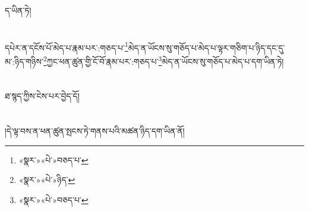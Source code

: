 ད་ཡིན་ཏེ།\chapter{ }དཔེར་ན་དངོས་པོ་མེད་པ་རྣམ་པར་:གཅད་པ་\footnote{«སྣར་»«པེ་»བཅད་པ་}མེད་ན་ཡོངས་སུ་གཅོད་པ་མེད་པ་ལྟར་གཅིག་པ་ཉིད་དང་དུ་མ་:ཉིད་གཉིས་\footnote{«སྣར་»«པེ་»ཉིད་}ཀྱང་ཕན་ཚུན་གྱི་ངོ་བོ་རྣམ་པར་:གཅད་པ་\footnote{«སྣར་»«པེ་»བཅད་པ་}མེད་ན་ཡོངས་སུ་གཅོད་པ་མེད་པ་དག་ཡིན་ཏེ།\chapter{ }ཐ་སྙད་ཀྱིས་ངེས་པར་བྱེད་དོ།\chapter{ }།དེ་ལྟ་བས་ན་ཕན་ཚུན་སྤངས་ཏེ་གནས་པའི་མཚན་ཉིད་དག་ཡིན་ནོ།\chapt